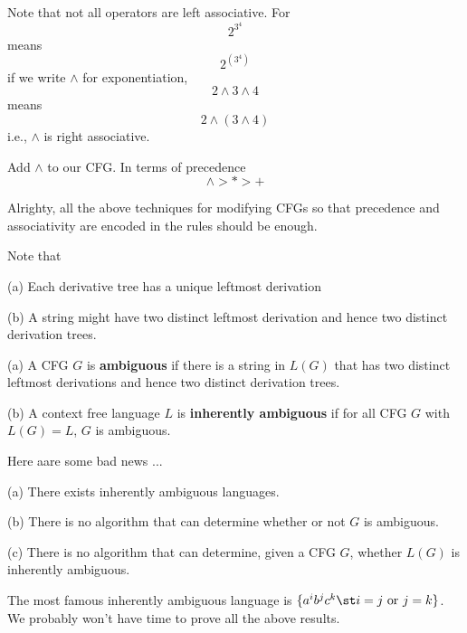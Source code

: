 Note that not all operators are left associative.
For 
\[
2^{3^4}
\]
means
\[
2^{(3^4)}
\]
if we write $\land$ for exponentiation,
\[
2 \land 3 \land 4
\]
means 
\[
2 \land (3 \land 4)
\]
i.e., $\land$ is right associative.


\begin{ex}
Add $\land$ to our CFG.
In terms of precedence
\[
\land > * > +
\]
\end{ex}

Alrighty, all the above techniques for modifying CFGs so that precedence and 
associativity are encoded in the rules should be enough.

Note that
\begin{mylist}
 \item[(a)] Each derivative tree has a unique leftmost derivation
 \item[(b)] A string might have two distinct leftmost derivation and hence two
 distinct derivation trees.
\end{mylist}

\begin{defn}
\begin{mylist}
\item[(a)] A CFG $G$ is
\textbf{ambiguous} if there is a string in $L(G)$ that
has two distinct leftmost derivations and hence two distinct derivation trees.
\item[(b)] A context free language $L$ is
\textbf{inherently ambiguous} if for 
all CFG $G$ with $L(G) = L$, $G$ is ambiguous.
\end{mylist}
\end{defn}

Here aare some bad news ...

\begin{thm}
\begin{mylist}
\item[(a)] There exists inherently ambiguous languages.
\item[(b)] There is no algorithm that can determine whether or not $G$ is 
ambiguous.
\item[(c)] There is no algorithm that can determine, given a CFG $G$, 
whether $L(G)$ is inherently ambiguous.
\end{mylist}
\end{thm}

The most famous inherently ambiguous language is 
$\{ a^i b^j c^k \st i = j \text{ or } j = k 
\}$.
We probably won't have time to prove all the above results.
